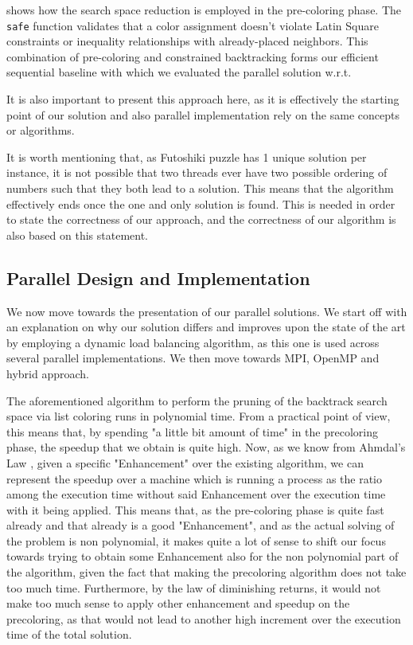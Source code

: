  shows how the search space reduction is employed in the pre-coloring phase. The \texttt{safe} function validates that a color assignment doesn't violate Latin Square constraints or inequality relationships with already-placed neighbors. This combination of pre-coloring and constrained backtracking forms our efficient sequential baseline with which we evaluated the parallel solution w.r.t.

It is also important to present this approach here, as it is effectively the starting point of our solution and also parallel implementation rely on the same concepts or algorithms.

It is worth mentioning that, as Futoshiki puzzle has 1 unique solution per instance, it is not possible that two threads ever have two possible ordering of numbers such that they both lead to a solution. This means that the algorithm effectively ends once the one and only solution is found. This is needed in order to state the correctness of our approach, and the correctness of our algorithm is also based on this statement.

\subsection{Parallel Design and Implementation}
\label{subsec:parallel_implementation}
We now move towards the presentation of our parallel solutions. We start off with an explanation on why our solution differs and improves upon the state of the art by employing a dynamic load balancing algorithm, as this one is used across several parallel implementations. We then move towards MPI, OpenMP and hybrid approach. 

The aforementioned algorithm to perform the pruning of the backtrack search space via list coloring runs in polynomial time. From a practical point of view, this means that, by spending "a little bit amount of time" in the precoloring phase, the speedup that we obtain is quite high. Now, as we know from Ahmdal's Law \cite{ahmdals_law}, given a specific "Enhancement" over the existing algorithm, we can represent the speedup over a machine which is running a process as the ratio among the execution time without said Enhancement over the execution time with it being applied. This means that, as the pre-coloring phase is quite fast already and that already is a good "Enhancement", and as the actual solving of the problem is non polynomial, it makes quite a lot of sense to shift our focus towards trying to obtain some Enhancement also for the non polynomial part of the algorithm, given the fact that making the precoloring algorithm does not take too much time. Furthermore, by the law of diminishing returns, it would not make too much sense to apply other enhancement and speedup on the precoloring, as that would not lead to another high increment over the execution time of the total solution.

